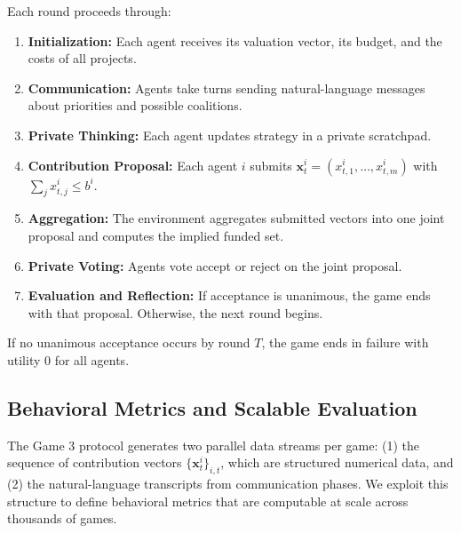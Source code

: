 Each round proceeds through:

\begin{enumerate}
    \item \textbf{Initialization:} Each agent receives its valuation vector, its budget, and the costs of all projects.
    \item \textbf{Communication:} Agents take turns sending natural-language messages about priorities and possible coalitions.
    \item \textbf{Private Thinking:} Each agent updates strategy in a private scratchpad.
    \item \textbf{Contribution Proposal:} Each agent $i$ submits $\bm{x}^i_t = (x^i_{t,1}, \ldots, x^i_{t,m})$ with $\sum_j x^i_{t,j} \leq b^i$.
    \item \textbf{Aggregation:} The environment aggregates submitted vectors into one joint proposal and computes the implied funded set.
    \item \textbf{Private Voting:} Agents vote accept or reject on the joint proposal.
    \item \textbf{Evaluation and Reflection:} If acceptance is unanimous, the game ends with that proposal. Otherwise, the next round begins.
\end{enumerate}

If no unanimous acceptance occurs by round $T$, the game ends in failure with utility 0 for all agents.

\subsection{Behavioral Metrics and Scalable Evaluation}
\label{sec:game_3_behavioral_metrics}

The Game 3 protocol generates two parallel data streams per game: (1) the sequence of contribution vectors $\{\bm{x}^i_t\}_{i,t}$, which are structured numerical data, and (2) the natural-language transcripts from communication phases.
We exploit this structure to define behavioral metrics that are computable at scale across thousands of games.

